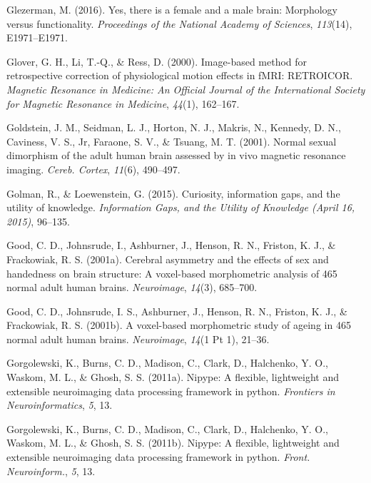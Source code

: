 \documentclass[11pt,american,]{memoir} %
\begin{document}
\leavevmode\hypertarget{ref-Glezerman2016-xl}{}%
Glezerman, M. (2016). Yes, there is a female and a male brain: Morphology versus functionality. \emph{Proceedings of the National Academy of Sciences}, \emph{113}(14), E1971--E1971.

\leavevmode\hypertarget{ref-Glover2000-or}{}%
Glover, G. H., Li, T.-Q., \& Ress, D. (2000). Image-based method for retrospective correction of physiological motion effects in fMRI: RETROICOR. \emph{Magnetic Resonance in Medicine: An Official Journal of the International Society for Magnetic Resonance in Medicine}, \emph{44}(1), 162--167.

\leavevmode\hypertarget{ref-Goldstein2001-dy}{}%
Goldstein, J. M., Seidman, L. J., Horton, N. J., Makris, N., Kennedy, D. N., Caviness, V. S., Jr, Faraone, S. V., \& Tsuang, M. T. (2001). Normal sexual dimorphism of the adult human brain assessed by in vivo magnetic resonance imaging. \emph{Cereb. Cortex}, \emph{11}(6), 490--497.

\leavevmode\hypertarget{ref-golman2015curiosity}{}%
Golman, R., \& Loewenstein, G. (2015). Curiosity, information gaps, and the utility of knowledge. \emph{Information Gaps, and the Utility of Knowledge (April 16, 2015)}, 96--135.

\leavevmode\hypertarget{ref-Good2001-ak}{}%
Good, C. D., Johnsrude, I., Ashburner, J., Henson, R. N., Friston, K. J., \& Frackowiak, R. S. (2001a). Cerebral asymmetry and the effects of sex and handedness on brain structure: A voxel-based morphometric analysis of 465 normal adult human brains. \emph{Neuroimage}, \emph{14}(3), 685--700.

\leavevmode\hypertarget{ref-Good2001-kv}{}%
Good, C. D., Johnsrude, I. S., Ashburner, J., Henson, R. N., Friston, K. J., \& Frackowiak, R. S. (2001b). A voxel-based morphometric study of ageing in 465 normal adult human brains. \emph{Neuroimage}, \emph{14}(1 Pt 1), 21--36.

\leavevmode\hypertarget{ref-gorgolewski2011nipype}{}%
Gorgolewski, K., Burns, C. D., Madison, C., Clark, D., Halchenko, Y. O., Waskom, M. L., \& Ghosh, S. S. (2011a). Nipype: A flexible, lightweight and extensible neuroimaging data processing framework in python. \emph{Frontiers in Neuroinformatics}, \emph{5}, 13.

\leavevmode\hypertarget{ref-Gorgolewski2011-aa}{}%
Gorgolewski, K., Burns, C. D., Madison, C., Clark, D., Halchenko, Y. O., Waskom, M. L., \& Ghosh, S. S. (2011b). Nipype: A flexible, lightweight and extensible neuroimaging data processing framework in python. \emph{Front. Neuroinform.}, \emph{5}, 13.
\end{document}

